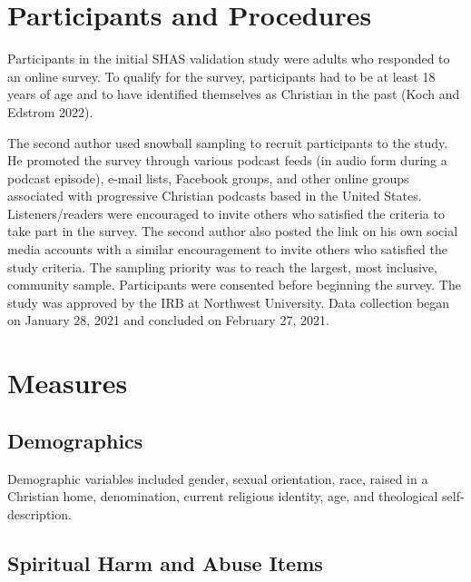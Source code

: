 \documentclass[
  letterpaper,
]{article}
\begin{document}
\hypertarget{participants-and-procedures}{%
\section*{Participants and
Procedures}\label{participants-and-procedures}}

Participants in the initial SHAS validation study were adults who
responded to an online survey. To qualify for the survey, participants
had to be at least 18 years of age and to have identified themselves as
Christian in the past (Koch and Edstrom 2022).

The second author used snowball sampling to recruit participants to the
study. He promoted the survey through various podcast feeds (in audio
form during a podcast episode), e-mail lists, Facebook groups, and other
online groups associated with progressive Christian podcasts based in
the United States. Listeners/readers were encouraged to invite others
who satisfied the criteria to take part in the survey. The second author
also posted the link on his own social media accounts with a similar
encouragement to invite others who satisfied the study criteria. The
sampling priority was to reach the largest, most inclusive, community
sample. Participants were consented before beginning the survey. The
study was approved by the IRB at Northwest University. Data collection
began on January 28, 2021 and concluded on February 27, 2021.

\hypertarget{measures}{%
\section*{Measures}\label{measures}}

\hypertarget{demographics}{%
\subsection*{Demographics}\label{demographics}}

Demographic variables included gender, sexual orientation, race, raised
in a Christian home, denomination, current religious identity, age, and
theological self-description.

\hypertarget{spiritual-harm-and-abuse-items}{%
\subsection*{Spiritual Harm and Abuse
Items}\label{spiritual-harm-and-abuse-items}}
\end{document}
